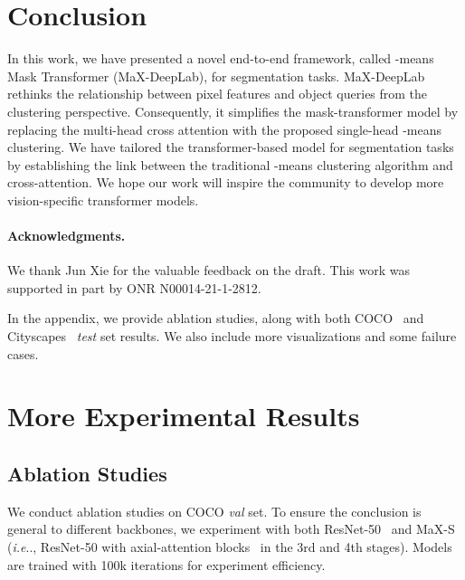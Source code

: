 \documentclass[runningheads]{llncs}
\makeatletter
\DeclareRobustCommand\onedot{\futurelet\@let@token\@onedot}
\def\@onedot{\ifx\@let@token.\else.\null\fi\xspace}
\def\ie{\emph{i.e}\onedot} \def\Ie{\emph{I.e}\onedot}
\makeatother
\begin{document}
\label{sec:results} \section{Conclusion}
\label{sec:conclusion}
In this work, we have presented a novel end-to-end framework, called -means Mask Transformer (MaX-DeepLab), for segmentation tasks.
MaX-DeepLab rethinks the relationship between pixel features and object queries from the clustering perspective.
Consequently, it simplifies the mask-transformer model by replacing the multi-head cross attention with the proposed single-head -means clustering.
We have tailored the transformer-based model for segmentation tasks by establishing the link between the traditional -means clustering algorithm and cross-attention.
We hope our work will inspire the community to develop more vision-specific transformer models.

\paragraph{Acknowledgments.}
We thank Jun Xie for the valuable feedback on the draft. This work was supported in part by ONR N00014-21-1-2812. 


\clearpage



\clearpage

\appendix
In the appendix, we provide ablation studies, along with both COCO~\cite{lin2014microsoft} and Cityscapes~\cite{Cordts2016Cityscapes} \textit{test} set results. We also include more visualizations and some failure cases.

\section{More Experimental Results}

\subsection{Ablation Studies}
We conduct ablation studies on COCO \textit{val} set. To ensure the conclusion is general to different backbones, we experiment with both ResNet-50~\cite{he2016deep} and MaX-S~\cite{wang2021max} (\ie, ResNet-50 with axial-attention blocks~\cite{wang2020axial} in the 3rd and 4th stages). Models are trained with 100k iterations for experiment efficiency.
\end{document}
